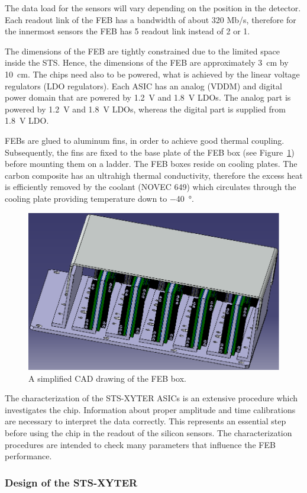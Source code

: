 The data load for the sensors will vary depending on the position in the detector. Each readout link of the \gls{FEB} has a bandwidth of about 320 Mb/s, therefore for the innermost sensors the \gls{FEB} has 5 readout link instead of 2 or 1. 

The dimensions of the \gls{FEB} are tightly constrained due to the limited space inside the \gls{STS}. Hence, the dimensions of the \gls{FEB} are approximately \SI{3}{\centi\metre} by \SI{10}{\centi\metre}. The chips need also to be powered, what is achieved by the linear voltage regulators (\gls{LDO} regulators). Each \gls{ASIC} has an analog (VDDM) and digital power domain that are powered by 1.2~V and 1.8~V \glspl{LDO}. The analog part is powered by 1.2~V and 1.8~V \glspl{LDO}, whereas the digital part is supplied from 1.8~V \gls{LDO}.

\glspl{FEB} are glued to aluminum fins, in order to achieve good thermal coupling. Subsequently, the fins are fixed to the base plate of the \gls{FEB} box (see Figure~\ref{feb_box}) before mounting them on a ladder. The \gls{FEB} boxes reside on cooling plates. The carbon composite has an ultrahigh thermal conductivity, therefore the excess heat is efficiently removed by the coolant (NOVEC 649) which circulates through the cooling plate providing temperature down to \SI{-40}{\degree}. 

\begin{figure}[!h]
\centering
\includegraphics[width=0.45\columnwidth]{Chapter2/images/feb_box.png}
\caption{A simplified CAD drawing of the \gls{FEB} box.}
\label{feb_box}
\end{figure}


The characterization of the STS-XYTER ASICs is an extensive procedure which investigates the chip. Information about proper amplitude and time calibrations are necessary to interpret the data correctly. This represents an essential step before using the chip in the readout of the silicon sensors. The characterization procedures are intended to
check many parameters that influence the \gls{FEB} performance. 


\subsubsection{Design of the STS-XYTER}

